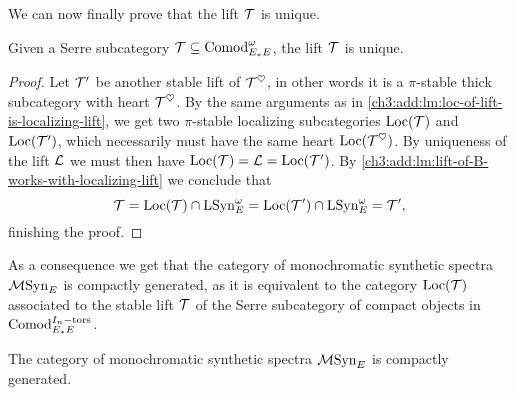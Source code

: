We can now finally prove that the lift $\mathcal{T}$ is unique. 

\begin{theorem}
    \label{ch3:add:thm:uniqueness-of-lift}
    Given a Serre subcategory $\mathcal{T}\subseteq \mathrm{Comod}_{E_*E}^\omega$, the lift $\mathcal{T}$ is unique. 
\end{theorem}
\begin{proof}
    Let $\mathcal{T}'$ be another stable lift of $\mathcal{T}^\heartsuit$, in other words it is a $\pi$-stable thick subcategory with heart $\mathcal{T}^\heartsuit$. By the same arguments as in \cref{ch3:add:lm:loc-of-lift-is-localizing-lift}, we get two $\pi$-stable localizing subcategories $\operatorname{Loc}(\mathcal{T})$ and $\operatorname{Loc}(\mathcal{T}')$, which necessarily must have the same heart $\operatorname{Loc}(\mathcal{T}^\heartsuit)$. By uniqueness of the lift $\mathcal{L}$ we must then have $\operatorname{Loc}(\mathcal{T}) = \mathcal{L} = \operatorname{Loc}(\mathcal{T}')$. By \cref{ch3:add:lm:lift-of-B-works-with-localizing-lift} we conclude that 
    \[\mathcal{T} = \operatorname{Loc}(\mathcal{T})\cap \mathrm{LSyn}_{E}^\omega = \operatorname{Loc}(\mathcal{T}')\cap \mathrm{LSyn}_{E}^\omega = \mathcal{T}',\]
    finishing the proof. 
\end{proof}

As a consequence we get that the category of monochromatic synthetic spectra $\mathcal{M}\mathrm{Syn}_{E}$ is compactly generated, as it is equivalent to the category $\operatorname{Loc}(\mathcal{T})$ associated to the stable lift $\mathcal{T}$ of the Serre subcategory of compact objects in $\mathrm{Comod}_{E_*E}^{I_n-\mathrm{tors}}$. 

\begin{corollary}
    The category of monochromatic synthetic spectra $\mathcal{M}\mathrm{Syn}_{E}$ is compactly generated. 
\end{corollary}




